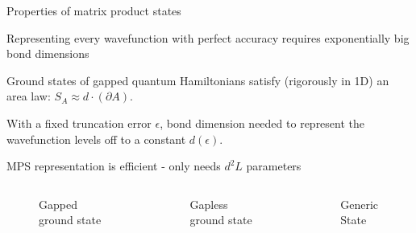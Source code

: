 \begin{frame}{Properties of matrix product states}
\vskip-1.5cm
\bi 
\item Representing every wavefunction with perfect accuracy requires exponentially big bond dimensions
\item Ground states of gapped quantum Hamiltonians satisfy (rigorously in 1D) an area law: $S_A \approx d \cdot (\partial A)$.
\item With a fixed truncation error $\epsilon$, bond dimension needed to represent the wavefunction levels off to a constant $d(\epsilon)$.
\item MPS representation is efficient - only needs $d^2L$ parameters  
\ei 

\begin{columns}[T]
    \begin{column}[T]{.33\textwidth}
        \begin{figure}[h]
            \centering
            \scalebox{0.45}{
            
            }
            \caption{Gapped ground state}
        \end{figure}
    \end{column}
    \begin{column}[T]{.33\textwidth}
            \begin{figure}[h]
            \centering
            \scalebox{0.45}{
            
            }
            \caption{Gapless ground state}
        \end{figure}
    \end{column}
    \begin{column}[T]{.33\textwidth}
            \begin{figure}[h]
            \centering
            \scalebox{0.45}{
            
            }
            \caption{Generic State}
        \end{figure}
    \end{column}
\end{columns}
    
    

\end{frame}